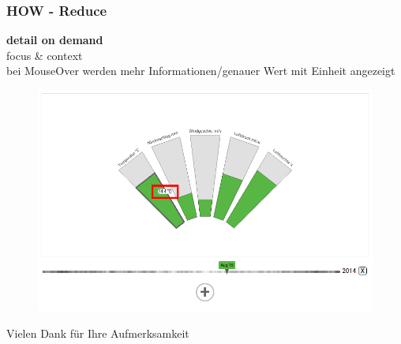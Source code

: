 \documentclass{beamer}
\begin{document}
  \begin{frame}
  \frametitle{HOW - Reduce}
    \textbf{detail on demand}
    \\ focus \& context
    \\ bei MouseOver werden mehr Informationen/genauer Wert mit Einheit angezeigt
    \begin{figure}[h]
      \centering
      \includegraphics[width=.6\paperwidth,keepaspectratio=true]{./media/detail_on_demand.png}
    \end{figure}
  \end{frame}
  
  \begin{frame}
  \centering
  Vielen Dank für Ihre Aufmerksamkeit
  \end{frame}



  
\end{document}
